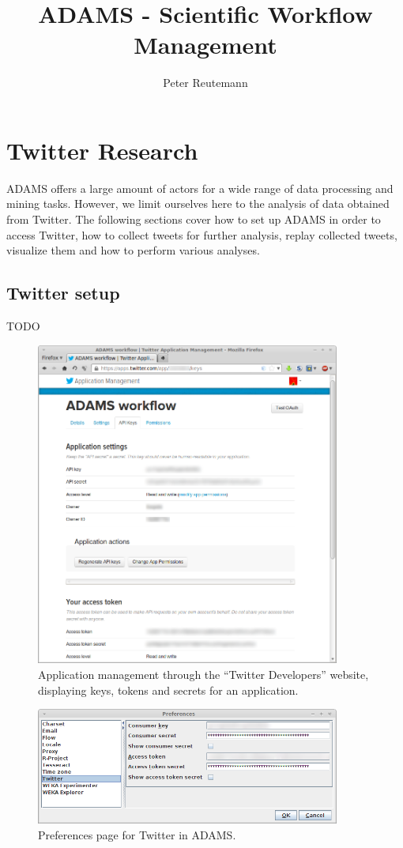 \documentclass[a4paper,10pt]{book}
\title{ADAMS - Scientific Workflow Management}
\author{Peter Reutemann}
\begin{document}
\chapter{Twitter Research}
ADAMS offers a large amount of actors for a wide range of data processing and mining tasks. However, we limit ourselves here to the analysis of data obtained from Twitter. The following sections cover how to set up ADAMS in order to access Twitter, how to collect tweets for further analysis, replay collected tweets, visualize them and how to perform various analyses.

\section{Twitter setup}
TODO

\begin{figure}[htb]
  \centering
  \includegraphics[width=10.0cm]{images/twitter_dev.png}
  \caption{Application management through the ``Twitter Developers'' website, displaying keys, tokens and secrets for an application.}
  \label{twitter_dev}
\end{figure}

\begin{figure}[htb]
  \centering
  \includegraphics[width=10.0cm]{images/twitter_preferences.png}
  \caption{Preferences page for Twitter in ADAMS.}
  \label{twitter_preferences}
\end{figure}
\end{document}
